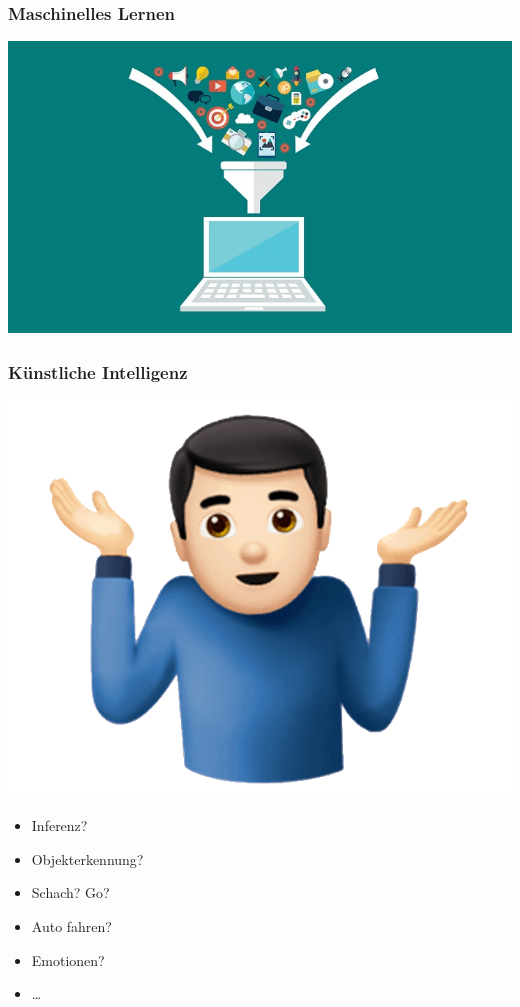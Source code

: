 \documentclass[aspectratio=169,xcolor=dvipsnames]{beamer}
\begin{document}
\begin{frame}
\frametitle{\glqq Maschinelles Lernen\grqq}
\begin{center}
\includegraphics[height=0.7\paperheight,keepaspectratio]{images/funnel} 
\end{center}
\end{frame}

\begin{frame}
\frametitle{\glqq Künstliche Intelligenz\grqq}
\begin{minipage}{0.5\paperwidth}
\begin{center}
\includegraphics[height=0.6\paperheight,keepaspectratio]{images/man-shrug} 
\end{center}
\end{minipage}\begin{minipage}{0.3\paperwidth}
\Large
\begin{itemize}
\item Inferenz?
\item Objekterkennung?
\item Schach? Go?
\item Auto fahren?
\item Emotionen?
\item \dots
\end{itemize}
\end{minipage}
\end{frame}
\end{document}
